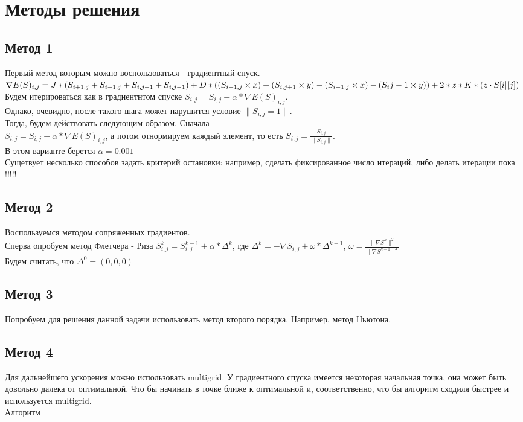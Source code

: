 \documentclass[ 12pt,x11names]{article}
\begin{document}
    \section{Методы решения}
    \subsection{Метод 1}
    Первый метод которым можно воспользоваться  - градиентный спуск.
    $\nabla E(S)_{i, j} = J * (S_{i + 1,j} + S_{i - 1,j} + S_{i, j + 1} + S_{i, j - 1})
        + \\ D * ( (S_{i + 1,j} \times x) + (S_{i, j + 1} \times y) -  (S_{i - 1, j} \times x) - (S_{i}{j - 1} \times y) )
        + 2 * z * K * (z \cdot S[i][j])$\\
    Будем  итерироваться как в градиентнтом спуске $S_{i, j} = S_{i, j} - \alpha * \nabla E(S)_{i, j}$.\\
    Однако, очевидно, после такого шага может  нарушится условие $\|S_{i, j} = 1\|$.\\
    Тогда, будем действовать следующим образом. Сначала \\$S_{i, j} = S_{i, j} - \alpha * \nabla E(S)_{i, j}$, а потом отнормируем каждый элемент, то есть $S_{i, j} = \frac{S_{i, j}}{\|S_{i, j}\|}$.\\
    В этом варианте берется $\alpha = 0.001$\\
    Сущетвует несколько способов задать критерий остановки: например, сделать фиксированное число итераций, либо делать итерации пока !!!!!
    \subsection{Метод 2}
    Воспользуемся методом сопряженных градиентов.\\
    Сперва опробуем метод Флетчера - Риза
    $S^k_{i, j} = S^{k-1}_{i, j} + \alpha * \Delta^k $, где $\Delta^k = -\nabla S_{i, j} + \omega * \Delta ^  {k-1} $,
    $\omega  = \frac{\| \nabla S^k \|^2}{\| \nabla S^{k-1} \|^2}$\\
    Будем считать, что $\Delta^0=(0,0,0)$
    \subsection{Метод 3}
    Попробуем для решения данной задачи использовать метод второго порядка. Например, метод Ньютона.

    \subsection{Метод 4}
    Для дальнейшего ускорения можно использовать multigrid.
    У градиентного спуска имеется некоторая начальная точка, она может быть довольно далека от оптимальной.
    Что бы начинать в точке ближе к оптимальной и, соответственно, что бы алгоритм сходиля быстрее и  используется multigrid.\\
    Алгоритм
    \newpage
\end{document}
